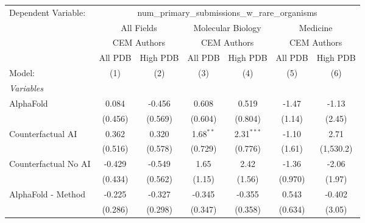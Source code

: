 \begingroup
\centering
\begin{tabular}{lcccccc}
   \tabularnewline \midrule \midrule
   Dependent Variable: & \multicolumn{6}{c}{num\_primary\_submissions\_w\_rare\_organisms}\\
 & \multicolumn{2}{c}{All Fields} & \multicolumn{2}{c}{Molecular Biology} & \multicolumn{2}{c}{Medicine} \\
\cmidrule(lr){2-3} \cmidrule(lr){4-5} \cmidrule(lr){6-7}
 & \multicolumn{2}{c}{CEM Authors} & \multicolumn{2}{c}{CEM Authors} & \multicolumn{2}{c}{CEM Authors} \\
\cmidrule(lr){2-3} \cmidrule(lr){4-5} \cmidrule(lr){6-7}
 & \multicolumn{1}{c}{All PDB} & \multicolumn{1}{c}{High PDB} & \multicolumn{1}{c}{All PDB} & \multicolumn{1}{c}{High PDB} & \multicolumn{1}{c}{All PDB} & \multicolumn{1}{c}{High PDB} \\
\cmidrule(lr){2-2} \cmidrule(lr){3-3} \cmidrule(lr){4-4} \cmidrule(lr){5-5} \cmidrule(lr){6-6} \cmidrule(lr){7-7}
   Model:                                                     & (1)     & (2)         & (3)           & (4)           & (5)        & (6)\\  
   \midrule
   \emph{Variables}\\
   AlphaFold                                                  & 0.084   & -0.456      & 0.608         & 0.519         & -1.47      & -1.13\\   
                                                              & (0.456) & (0.569)     & (0.604)       & (0.804)       & (1.14)     & (2.45)\\   
   Counterfactual AI                                          & 0.362   & 0.320       & 1.68$^{**}$   & 2.31$^{***}$  & -1.10      & 2.71\\   
                                                              & (0.516) & (0.578)     & (0.729)       & (0.776)       & (1.61)     & (1,530.2)\\   
   Counterfactual No AI                                       & -0.429  & -0.549      & 1.65          & 2.42          & -1.36      & -2.06\\   
                                                              & (0.434) & (0.562)     & (1.15)        & (1.56)        & (0.970)    & (1.97)\\   
   AlphaFold - Method                                         & -0.225  & -0.327      & -0.345        & -0.355        & 0.543      & -0.402\\   
                                                              & (0.286) & (0.298)     & (0.347)       & (0.358)       & (0.634)    & (3.05)\\   

\end{tabular}
